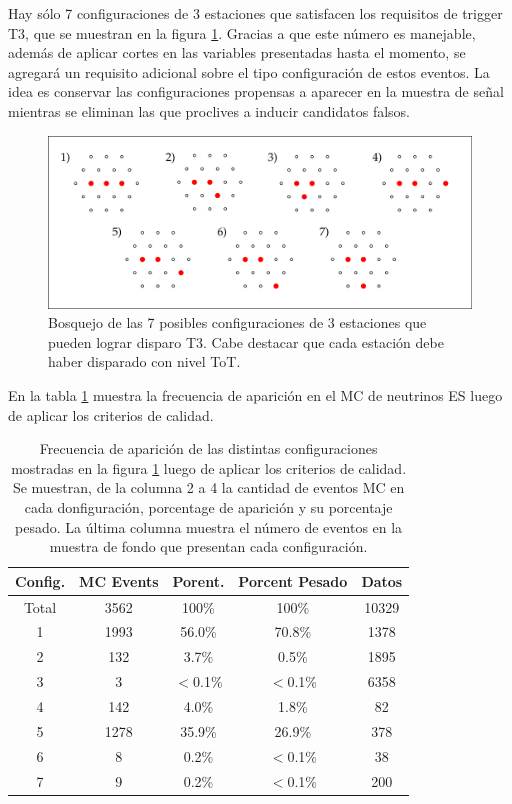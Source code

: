 		Hay sólo 7 configuraciones de 3 estaciones que satisfacen los requisitos de trigger T3, que se muestran en la figura \ref{fig:3stConf}.
		Gracias a que este número es manejable, además de aplicar cortes en las variables presentadas hasta el momento, se agregará un requisito adicional sobre el tipo configuración de estos eventos.
		La idea es conservar las configuraciones propensas a aparecer en la muestra de señal mientras se eliminan las que proclives a inducir candidatos falsos.
		\begin{figure}[ht!]
		\begin{center}
		\includegraphics[width=1.0\textwidth]{fig/seleccionAuger/3stConf}
		\caption{Bosquejo de las 7 posibles configuraciones de 3 estaciones que pueden lograr disparo T3. Cabe destacar que cada estación debe haber disparado con nivel ToT.}
		\label{fig:3stConf}
		\end{center}
		\end{figure}
		En la tabla \ref{tab:3stConf} muestra la frecuencia de aparición en el MC de neutrinos ES luego de aplicar los criterios de calidad.
		\begin{table}[!h]
		\centering
		\begin{tabular}{|c|c|c|c|c|}
		\hline
		Config. & MC Events & Porent. & Porcent Pesado & Datos                  \\
		\hline
		Total & 3562 & 100\% & 100\%& 10329\\
		\hline
		1 & 1993 & 56.0\% & 70.8\% & 1378\\
		2 & 132 & 3.7\% & 0.5\% & 1895\\
		3 & 3 & $<$0.1\% & $<$0.1\% & 6358\\
		4 & 142 & 4.0\% & 1.8\% & 82\\
		5 & 1278 & 35.9\% & 26.9\% & 378\\
		6 & 8 & 0.2\% & $<$0.1\% & 38\\
		7 & 9 & 0.2\% & $<$0.1\% & 200\\
		\hline
		\end{tabular}
		\caption{
		\label{tab:3stConf}
		Frecuencia de aparición de las distintas configuraciones mostradas en la figura \ref{fig:3stConf} luego de aplicar los criterios de calidad.
		Se muestran, de la columna 2 a 4 la cantidad de eventos MC en cada donfiguración, porcentage de aparición y su porcentaje pesado.
		La última columna muestra el número de eventos en la muestra de fondo que presentan cada configuración.
		}
		\end{table}
